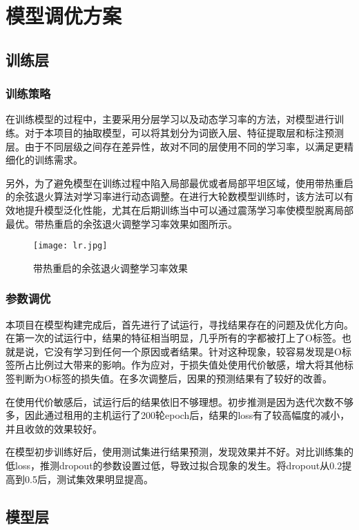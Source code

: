 \documentclass[letterpaper]{article}
\begin{document}
\section{模型调优方案}
  \subsection{训练层}
    \subsubsection{训练策略}
    在训练模型的过程中，主要采用分层学习以及动态学习率的方法，对模型进行训练。对于本项目的抽取模型，可以将其划分为词嵌入层、特征提取层和标注预测层。由于不同层级之间存在差异性，故对不同的层使用不同的学习率，以满足更精细化的训练需求。
    
    另外，为了避免模型在训练过程中陷入局部最优或者局部平坦区域，使用带热重启的余弦退火算法对学习率进行动态调整。在进行大轮数模型训练时，该方法可以有效地提升模型泛化性能，尤其在后期训练当中可以通过震荡学习率使模型脱离局部最优。带热重启的余弦退火调整学习率效果如图所示。
    \begin{figure}[h]
      \centering
      \texttt{[image: lr.jpg]}
      \caption{带热重启的余弦退火调整学习率效果}
    \end{figure}

    \subsubsection{参数调优}
    本项目在模型构建完成后，首先进行了试运行，寻找结果存在的问题及优化方向。在第一次的试运行中，结果的特征相当明显，几乎所有的字都被打上了O标签。也就是说，它没有学习到任何一个原因或者结果。针对这种现象，较容易发现是O标签所占比例过大带来的影响。作为应对，于损失值处使用代价敏感，增大将其他标签判断为O标签的损失值。在多次调整后，因果的预测结果有了较好的改善。
    
    在使用代价敏感后，试运行后的结果依旧不够理想。初步推测是因为迭代次数不够多，因此通过租用的主机运行了200轮epoch后，结果的loss有了较高幅度的减小，并且收敛的效果较好。
    
    在模型初步训练好后，使用测试集进行结果预测，发现效果并不好。对比训练集的低loss，推测dropout的参数设置过低，导致过拟合现象的发生。将dropout从0.2提高到0.5后，测试集效果明显提高。

  \subsection{模型层}
\end{document}
